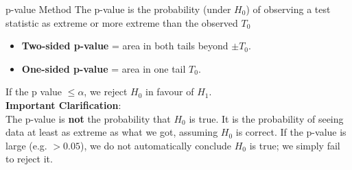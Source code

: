 \documentclass[9pt]{extarticle}
\begin{document}
\begin{conceptbox}{p-value Method}{}
    The p-value is the probability (under $H_0$) of observing a test statistic as extreme or more extreme than the observed $T_0$
    \begin{itemize}
        \item \textbf{Two-sided p-value} = area in both tails beyond $\pm T_0$.
        \item \textbf{One-sided p-value} = area in one tail $T_0$.
    \end{itemize}
    If the p value $\leq \alpha$, we reject $H_0$ in favour of $H_1$. \\[2ex]

    \textbf{Important Clarification}: \\
    The p-value is \textbf{not} the probability that $H_0$ is true. It is the probability of seeing data at least as extreme as what we got, assuming $H_0$ is correct. If the p-value is large (e.g. $> 0.05$), we do not automatically conclude $H_0$ is true; we simply fail to reject it.
\end{conceptbox}
\end{document}
